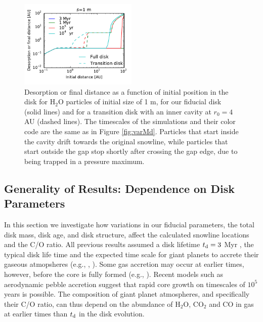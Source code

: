 \documentclass[apj]{emulateapj}
\begin{document}
\begin{figure}[h!]
\centering
\includegraphics[width=0.5\textwidth]{desorption_distance_transition_disk_1000.pdf}
\caption{Desorption or final distance as a function of initial position in the disk for H$_2$O particles of initial size of 1 m, for our fiducial disk (solid lines) and for a transition disk with an inner cavity at $r_0=4$ AU (dashed lines). The timescales of the simulations and their color code are the same as in Figure \ref{fig:varMd}. Particles that start inside the cavity drift towards the original snowline, while particles that start outside the gap stop shortly after crossing the gap edge, due to being trapped in a pressure maximum.}
\label{fig:cavity}
\end{figure}


\subsection{Generality of Results: Dependence on Disk Parameters}
\label{sec:incond}

In this section we investigate how variations in our fiducial parameters, the total disk mass, disk age, and disk structure, %
affect the calculated snowline locations and the C/O ratio. %
All previous results assumed a disk lifetime $t_{\rm d}=3$ Myr%
, the typical disk life time and the expected time scale for giant planets to accrete their gaseous atmopsheres (e.g., \citealt{pollack96}, \citealt{piso14}). Some gas accretion may occur at earlier times, however,%
before the core is fully formed (e.g., \citealt{rafikov06}). Recent models such as aerodynamic pebble accretion \citep{lambrechts12} suggest that rapid core growth on timescales of $10^5$ years is possible. %
The composition of giant planet atmospheres, and specifically their C/O ratio, can thus depend on the abundance of H$_2$O, CO$_2$ and CO in gas at earlier times than $t_{\rm d}$ in the disk evolution. 
\end{document}
